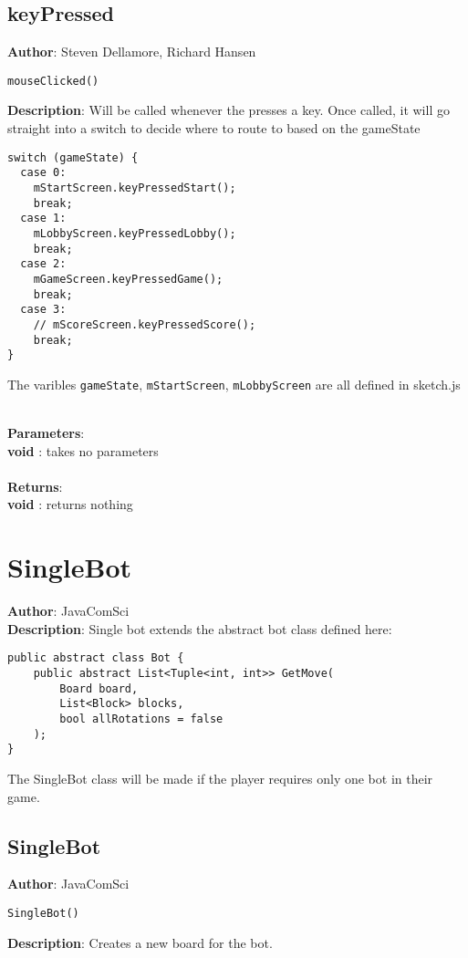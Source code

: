 \documentclass[12pt]{article}
\begin{document}
\subsection{keyPressed}
\textbf{Author}: Steven Dellamore, Richard Hansen 
\vspace*{1\baselineskip}
\begin{lstlisting}
mouseClicked()
\end{lstlisting} 
\vspace*{1\baselineskip}
\textbf{Description}: Will be called whenever the presses a key. Once called, it will go straight into a switch to decide where to route to based on the gameState 
\begin{verbatim}
switch (gameState) {
  case 0:
    mStartScreen.keyPressedStart();
    break;
  case 1:
    mLobbyScreen.keyPressedLobby();
    break;
  case 2:
    mGameScreen.keyPressedGame();
    break;
  case 3:
    // mScoreScreen.keyPressedScore();
    break;
}
\end{verbatim}
 The varibles \texttt{gameState}, \texttt{mStartScreen}, \texttt{mLobbyScreen} are all defined in sketch.js 


\textbf{\large{\\Parameters}}:\\
\textbf{void }: takes no parameters\\\textbf{\large{\\Returns}}:\\\textbf{void }: returns nothing

\section{SingleBot}
\textbf{Author}: JavaComSci \\
\textbf{Description}: Single bot extends the abstract bot class defined here: 
\begin{verbatim}
public abstract class Bot {
    public abstract List<Tuple<int, int>> GetMove(
        Board board, 
        List<Block> blocks, 
        bool allRotations = false
    );
}
\end{verbatim}
 The SingleBot class will be made if the player requires only one bot in their game. \\



\subsection{SingleBot}
\textbf{Author}: JavaComSci 
\vspace*{1\baselineskip}
\begin{lstlisting}
SingleBot()
\end{lstlisting} 
\vspace*{1\baselineskip}
\textbf{Description}: Creates a new board for the bot. 
\end{document}
